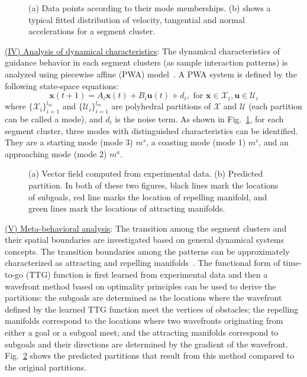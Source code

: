 \documentclass[journal]{IEEEtran}
\begin{document}
\begin{figure}[!t]
\centering
{}
\caption{(a) Data points according to their mode memberships. (b) shows a typical fitted distribution of velocity, tangential and normal accelerations for a segment cluster.} \label{fig:PWA_model}
\end{figure}

\underline{(IV) Analysis of dynamical characteristics}: The dynamical characteristics of guidance behavior in each segment clusters (as sample interaction patterns) is analyzed using piecewise affine (PWA) model~\cite{ferrari2003clustering}. A PWA system is defined by the following state-space equations:
\begin{equation}
\mathbf{x}(t+1)=A_i\mathbf{x}(t)+B_i\mathbf{u}(t)+d_i, \text{ for } \mathbf{x} \in \mathcal{X}_i, \mathbf{u} \in \mathcal{U}_i
\label{e:PWA_model}
\end{equation}
where $\{\mathcal{X}_i\}_{i=1}^{l_m}$ and $\{\mathcal{U}_i\}_{i=1}^{l_m}$ are polyhedral partitions of $\mathcal{X}$ and $\mathcal{U}$ (each partition can be called a mode), and $d_i$ is the noise term. As shown in Fig.~\ref{fig:PWA_model}, for each segment cluster, three modes with distinguished characteristics can be identified. They are a starting mode (mode 3) $m^s$, a coasting mode (mode 1) $m^c$, and an approaching mode (mode 2) $m^a$.

\begin{figure}[!t]
\centering
{}
\caption{(a) Vector field computed from experimental data. (b) Predicted partition. In both of these two figures, black lines mark the locations of subgoals, red line marks the location of repelling manifold, and green lines mark the locations of attracting manifolds.} \label{fig:meta_analysis}
\end{figure}

\underline{(V) Meta-behavioral analysis}: The transition among the segment clusters and their spatial boundaries are investigated based on general dynamical systems concepts. The transition boundaries among the patterns can be approximately characterized as attracting and repelling manifolds~\cite{kong2011foundations,kong2011investigation}. The functional form of time-to-go (TTG) function is first learned from experimental data and then a wavefront method based on optimality principles can be used to derive the partitions: the subgoals are determined as the locations where the wavefront defined by the learned TTG function meet the vertices of obstacles; the repelling manifolds correspond to the locations where two wavefronts originating from either a goal or a subgoal meet; and the attracting manifolds correspond to subgoals and their directions are determined by the gradient of the wavefront. Fig.~\ref{fig:meta_analysis} shows the predicted partitions that result from this method compared to the original partitions. 
\end{document}
